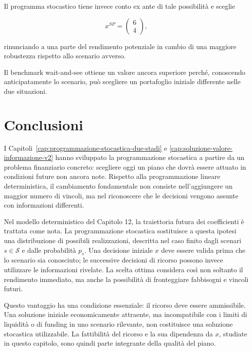 \begin{enumerate}
Il programma stocastico tiene invece
conto ex ante di tale possibilit\`a
e sceglie

\[
x^{SP}
=
\begin{pmatrix}
6\\
4
\end{pmatrix},
\]

rinunciando a una parte del rendimento
potenziale in cambio di una maggiore
robustezza rispetto allo scenario avverso.

Il benchmark wait-and-see ottiene
un valore ancora superiore perch\'e,
conoscendo anticipatamente lo scenario,
pu\`o scegliere un portafoglio
iniziale differente nelle due situazioni.

\end{enumerate}

\section{Conclusioni}
\label{sec:cap15-conclusioni-v2}

I Capitoli~\ref{cap:programmazione-stocastica-due-stadi} e
\ref{cap:soluzione-valore-informazione-v2} hanno sviluppato la
programmazione stocastica a partire da un problema finanziario
concreto: scegliere oggi un piano che dovr\`a essere attuato in
condizioni future non ancora note. Rispetto alla programmazione
lineare deterministica, il cambiamento fondamentale non consiste
nell'aggiungere un maggior numero di vincoli, ma nel riconoscere
che le decisioni vengono assunte con informazioni differenti.

Nel modello deterministico del Capitolo 12, la traiettoria futura
dei coefficienti \`e trattata come nota. La programmazione stocastica
sostituisce a questa ipotesi una distribuzione di possibili
realizzazioni, descritta nel caso finito dagli scenari $s\in\mathcal S$
e dalle probabilit\`a $p_s$. Una decisione iniziale $x$ deve
essere valida prima che lo scenario sia conosciuto; le successive
decisioni di ricorso possono invece utilizzare le informazioni
rivelate. La scelta ottima considera cos\`i non soltanto il
rendimento immediato, ma anche la possibilit\`a di fronteggiare
fabbisogni e vincoli futuri.

Questo vantaggio ha una condizione essenziale: il ricorso deve
essere ammissibile. Una soluzione iniziale economicamente
attraente, ma incompatibile con i limiti di liquidit\`a o di
funding in uno scenario rilevante, non costituisce una soluzione
stocastica utilizzabile. La fattibilit\`a del ricorso e la sua
dipendenza da $x$, studiate in questo capitolo, sono quindi parte
integrante della qualit\`a del piano.


